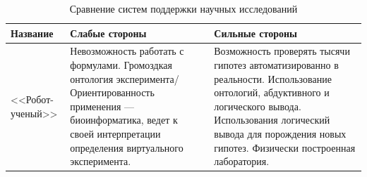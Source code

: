 \begin{table} [ht]%
	\caption{Сравнение систем поддержки научных исследований}%
	\label{tbl:comparison}%
    \setlength\extrarowheight{0pt} %
    \setlength{\tymin}{2.5cm}%
	\begin{tabulary}{\textwidth}{@{}>{\zz}L >{\zz}L >{\zz}L@{}}%
        \toprule     %
    	Название &
    	Слабые стороны &
    	Сильные стороны	\\
        \midrule %
        <<Робот-ученый>> &
        Невозможность работать с формулами. Громоздкая онтология эксперимента/ 
        Ориентированность применения --- биоинформатика, ведет к своей интерпретации 
        определения виртуального эксперимента. &
        Возможность проверять тысячи гипотез автоматизированно в реальности. 
        Использование онтологий, абдуктивного и логического вывода.
        Использования логический вывода для порождения новых гипотез. Физически построенная лаборатория.
        

\end{tabulary}
\end{table}
